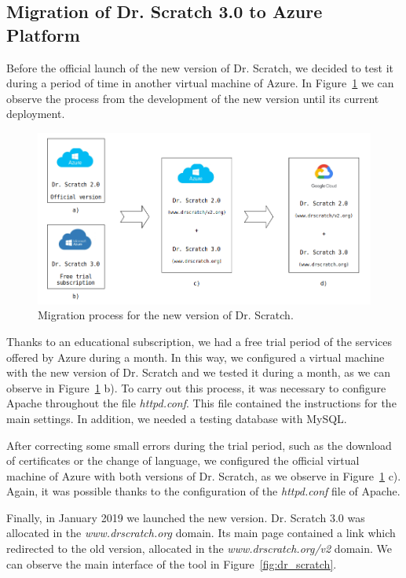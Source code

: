 \subsection{Migration of Dr. Scratch 3.0 to Azure Platform}
\label{subsec:mig_to_azure}

Before the official launch of the new version of Dr. Scratch, we decided to test it during a period of time in another virtual machine of Azure. In Figure~\ref{fig:migrations} we can observe the process from the development of the new version until its current deployment.

\begin{figure}
    \centering
    \includegraphics[width=14cm, keepaspectratio]{img/migrations.png}
    \caption{Migration process for the new version of Dr. Scratch.}
    \label{fig:migrations}
\end{figure}


Thanks to an educational subscription, we had a free trial period of the services offered by Azure during a month. In this way, we configured a virtual machine with the new version of Dr. Scratch and we tested it during a month, as we can observe in Figure~\ref{fig:migrations} b). To carry out this process, it was necessary to configure Apache throughout the file \textit{httpd.conf}. This file contained the instructions for the main settings. In addition, we needed a testing database with MySQL.

After correcting some small errors during the trial period, such as the download of certificates or the change of language,  we configured the official virtual machine of Azure with both versions of Dr. Scratch, as we observe in Figure~\ref{fig:migrations} c). Again, it was possible thanks to the configuration of the \textit{httpd.conf} file of Apache. 

Finally, in January 2019 we launched the new version. Dr. Scratch 3.0 was allocated in the \textit{www.drscratch.org} domain. Its main page contained a link which redirected to the old version, allocated in the \textit{www.drscratch.org/v2} domain. We can observe the main interface of the tool in Figure~\ref{fig:dr_scratch}.


